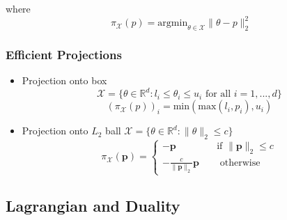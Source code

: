 \documentclass[a4paper,10pt,twoside=true,DIV=10,headsepline,plainheadsepline]{scrartcl}
\begin{document}
			where
				\begin{equation} 
					\pi_{\mathcal{X}}(p) = \textrm{argmin}_{\theta \in \mathcal{X}} \| \theta - p \|_2^2
				\end{equation}

		\subsubsection{Efficient Projections}
		\begin{itemize}
 			\item Projection onto box
			\begin{equation} 
				\mathcal{X} = \big\{ \theta \in \mathbb{R}^d : l_i \leq \theta_i \leq u_i \textrm{ for all } i = 1, ... , d \big\}
			\end{equation}
			\begin{equation} 
				(\pi_{\mathcal{X}}(p))_i = \textrm{min}(\textrm{max}(l_i, p_i), u_i)
			\end{equation}
			\item Projection onto $L_2$ ball $\mathcal{X} = \big\{ \theta \in \mathbb{R}^d : \| \theta \|_2 \leq c \big\}$
			\begin{equation} 
				\pi_{\mathcal{X}}(\mathbf{p}) = 
				\begin{cases}
    					- \mathbf{p} & \quad \text{if } \| \mathbf{p} \|_2 \leq c\\
    					- \frac{c}{\| \mathbf{p} \|_2} \mathbf{p}  & \quad \text{ otherwise} 
 				\end{cases}
			\end{equation}
		\end{itemize}


		\subsection{Lagrangian and Duality}
\end{document}
